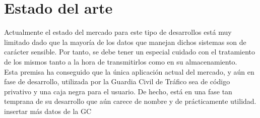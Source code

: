\chapter{Estado del arte}

Actualmente el estado del mercado para este tipo de desarrollos está muy limitado dado que 
la mayoría de los datos que manejan dichos sistemas son de carácter sensible. Por tanto, se 
debe tener un especial cuidado con el tratamiento de los mismos tanto a la hora de transmitirlos
como en su almacenamiento.\\

Esta premisa ha conseguido que la única aplicación actual del mercado, y aún en fase de desarrollo,
utilizada por la Guardia Civil de Tráfico sea de código privativo y una caja negra para el usuario.
De hecho, está en una fase tan temprana de su desarrollo que aún carece de nombre y de prácticamente 
utilidad.\\ 

insertar más datos de la GC


